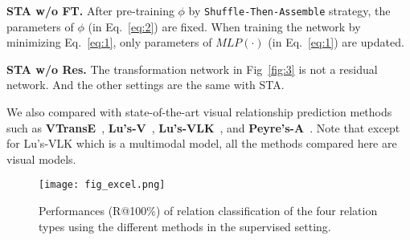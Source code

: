 \documentclass[runningheads]{llncs}
\begin{document}
\textbf{STA w/o FT.}
After pre-training $\phi$ by \texttt{Shuffle-Then-Assemble} strategy, the parameters of $\phi$ (in Eq.~\eqref{eq:2}) are fixed. When training the network by minimizing Eq.~\eqref{eq:1}, only parameters of $MLP(\cdot)$ (in Eq.~\eqref{eq:1}) are updated.

\textbf{STA w/o Res.}
The transformation network in Fig~\ref{fig:3} is not a residual network. And the other settings are the same with STA.

We also compared with state-of-the-art visual relationship prediction methods such as \textbf{VTransE}~\cite{zhang2017visual}, \textbf{Lu's-V}~\cite{lu2016visual}, \textbf{Lu's-VLK}~\cite{lu2016visual}, and \textbf{Peyre's-A}~\cite{peyre2017weakly}. Note that except for Lu's-VLK which is a multimodal model, all the methods compared here are visual models. 

\begin{figure}[t!]
\centering
\texttt{[image: fig\_excel.png]}
\caption{ Performances (R@100\%) of relation classification of the four relation types using the different methods in the supervised setting.
}
\label{fig:6}
\end{figure}
\end{document}
